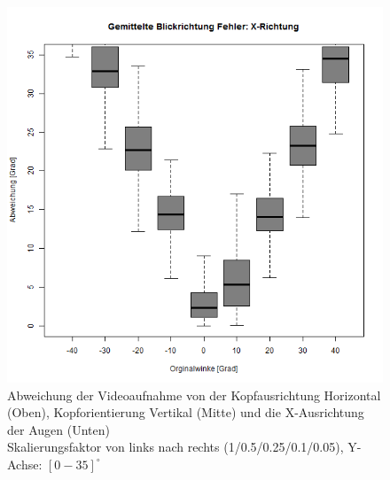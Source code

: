\begin{landscape}
\begin{figure}
		\includegraphics[width=0.192\linewidth]{OpenFace_Img/EyeAVG_x_Err_S005}
		\caption{Abweichung der Videoaufnahme von der Kopfausrichtung Horizontal (Oben), Kopforientierung Vertikal (Mitte) und die X-Ausrichtung der Augen (Unten)\\Skalierungsfaktor von links nach rechts (1/0.5/0.25/0.1/0.05), Y-Achse: $[0-35]^\circ$}
		\label{graph_VideoSkalierung_Err}
	\end{figure}
\end{landscape}
